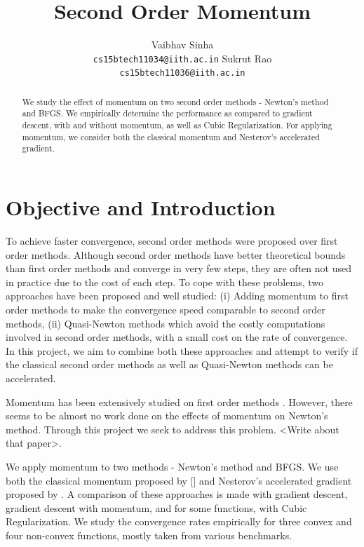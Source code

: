 \documentclass{article}
\title{Second Order Momentum}
\author{
  Vaibhav Sinha \\
  \texttt{cs15btech11034@iith.ac.in}
  \And
  Sukrut Rao \\
  \texttt{cs15btech11036@iith.ac.in}
}
\begin{document}
\maketitle

\begin{abstract}
  We study the effect of momentum on two second order methods - Newton's method and BFGS. We empirically determine the performance as compared to gradient descent, with and without momentum, as well as Cubic Regularization. For applying momentum, we consider both the classical momentum and Nesterov's accelerated gradient.
\end{abstract}

\section{Objective and Introduction}\label{introduction}

To achieve faster convergence, second order methods were proposed over first order methods. Although second order methods have better theoretical bounds than first order methods and converge in very few steps, they are often not used in practice due to the cost of each step. To cope with these problems, two approaches have been proposed and well studied: (i) Adding momentum \cite{POLYAK19641,Sutskever} to first order methods to make the convergence speed comparable to second order methods, (ii) Quasi-Newton methods \citep{davidon,broyden1965class,nocedal1980updating} which avoid the costly computations involved in second order methods, with a small cost on the rate of convergence. In this project, we aim to combine both these approaches and attempt to verify if the classical second order methods as well as Quasi-Newton methods can be accelerated.

Momentum has been extensively studied on first order methods \citep{POLYAK19641,Sutskever}. However, there seems to be almost no work done on the effects of momentum on Newton’s method. Through this project we seek to address this problem. <Write about that paper>.

We apply momentum to two methods - Newton's method and BFGS. We use both the classical momentum proposed by [] and Nesterov's accelerated gradient proposed by \citet{Sutskever}. A comparison of these approaches is made with gradient descent, gradient descent with momentum, and for some functions, with Cubic Regularization. We study the convergence rates empirically for three convex and four non-convex functions, mostly taken from various benchmarks.
\end{document}
